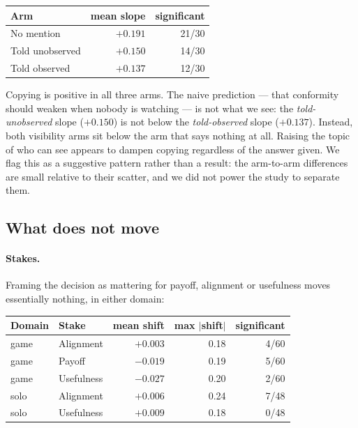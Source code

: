 \documentclass[11pt]{article}
\begin{document}
\begin{center}\small
\begin{tabular}{lrr}
\toprule
Arm & mean slope & significant \\
\midrule
No mention & $+0.191$ & 21/30 \\
Told unobserved & $+0.150$ & 14/30 \\
Told observed & $+0.137$ & 12/30 \\
\bottomrule
\end{tabular}
\end{center}

Copying is positive in all three arms. The naive prediction --- that conformity
should weaken when nobody is watching --- is not what we see: the
\emph{told-unobserved} slope ($+0.150$) is not below the \emph{told-observed}
slope ($+0.137$). Instead, both visibility arms sit below the arm that says
nothing at all. Raising the topic of who can see appears to dampen copying
regardless of the answer given. We flag this as a suggestive pattern rather than
a result: the arm-to-arm differences are small relative to their scatter, and
we did not power the study to separate them.

\subsection{What does not move}

\paragraph{Stakes.} Framing the decision as mattering for payoff, alignment or
usefulness moves essentially nothing, in either domain:

\begin{center}\small
\begin{tabular}{llrrr}
\toprule
Domain & Stake & mean shift & max $|$shift$|$ & significant \\
\midrule
game & Alignment & $+0.003$ & 0.18 & 4/60 \\
game & Payoff & $-0.019$ & 0.19 & 5/60 \\
game & Usefulness & $-0.027$ & 0.20 & 2/60 \\
solo & Alignment & $+0.006$ & 0.24 & 7/48 \\
solo & Usefulness & $+0.009$ & 0.18 & 0/48 \\
\bottomrule
\end{tabular}
\end{center}
\end{document}
